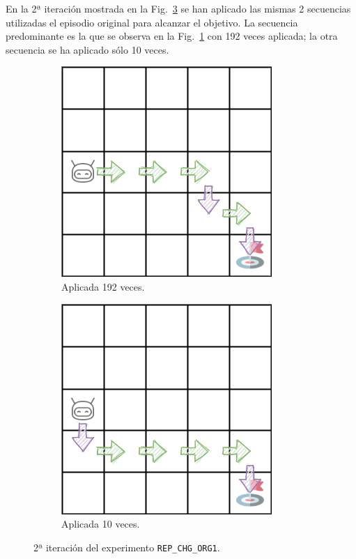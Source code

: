 En la 2ª iteración mostrada en la Fig.~\ref{fig:dim5_CHANGE_ORIGIN-20-09_00-42-50_0, 2, 1_2iter} se han aplicado las mismas 2 secuencias utilizadas el episodio original para alcanzar el objetivo. La secuencia predominante es la que se observa en la Fig.~\ref{fig:dim5_CHANGE_ORIGIN-20-09_00-42-50_192} con 192 veces aplicada; la otra secuencia se ha aplicado sólo 10 veces. \\
 
\begin{figure}
    \centering
    \begin{subfigure}{.5\textwidth}
        \centering
        \includegraphics[scale=0.4]{cap5_experimentacion/images/dim5_CHANGE_ORIGIN-20-09_00-42-50_121.png}
        \caption{Aplicada 192 veces.}
        \label{fig:dim5_CHANGE_ORIGIN-20-09_00-42-50_192}
    \end{subfigure}%
    \begin{subfigure}{.5\textwidth}
        \centering
        \includegraphics[scale=0.4]{cap5_experimentacion/images/dim5_CHANGE_ORIGIN-20-09_00-42-50_155.png}
        \caption{Aplicada 10 veces.}
        \label{fig:dim5_CHANGE_ORIGIN-20-09_00-42-50_10}
    \end{subfigure}
    \caption{2ª iteración del experimento \texttt{REP\_CHG\_ORG1}.}
    \label{fig:dim5_CHANGE_ORIGIN-20-09_00-42-50_0, 2, 1_2iter}
\end{figure}

